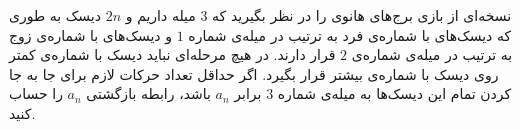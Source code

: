 \EXERCISE
نسخه‌ای از بازی برج‌های هانوی را در نظر بگیرید که 
$3$
میله داریم و 
$2n$
 دیسک به طوری که دیسک‌های با
شماره‌ی فرد به ترتیب در میله‌ی شماره 
$1$
 و دیسک‌های با شماره‌ی زوج به ترتیب در میله‌ی شماره‌ی 
$2$
 قرار دارند.
در هیچ مرحله‌ای نباید دیسک با شماره‌ی کمتر روی دیسک با شماره‌ی بیشتر قرار بگیرد. اگر حداقل تعداد حرکات لازم برای جا به جا کردن تمام این دیسک‌ها به میله‌ی شماره 
$3$
برابر 
$a_n$
 باشد، رابطه بازگشتی 
$a_n$ 
  را حساب کنید.